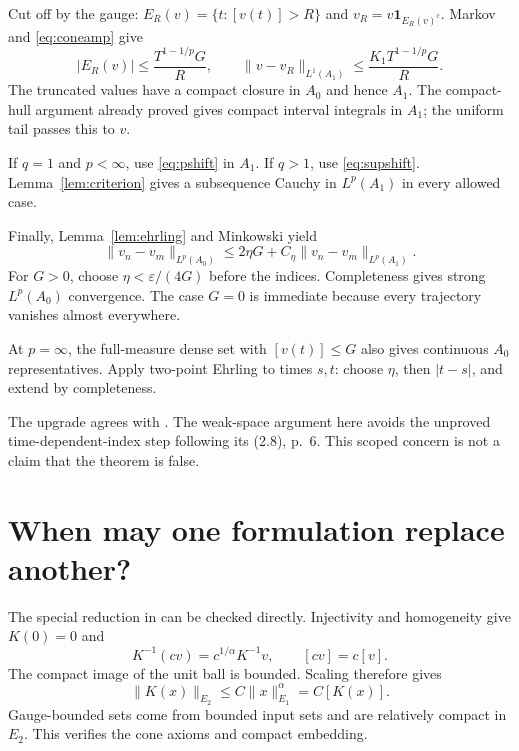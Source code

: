 \documentclass[12pt,reqno]{amsart}
\begin{document}
Cut off by the gauge: $E_R(v)=\{t:[v(t)]>R\}$ and $v_R=v\mathbf1_{E_R(v)^c}$. Markov and \eqref{eq:coneamp} give
\begin{equation}\label{eq:conetail}
|E_R(v)|\le\frac{T^{1-1/p}G}{R},\qquad
\|v-v_R\|_{L^1(A_1)}\le\frac{K_1T^{1-1/p}G}{R}.
\end{equation}
The truncated values have a compact closure in $A_0$ and hence $A_1$. The compact-hull argument already proved gives compact interval integrals in $A_1$; the uniform tail passes this to $v$.

If $q=1$ and $p<\infty$, use \eqref{eq:pshift} in $A_1$. If $q>1$, use \eqref{eq:supshift}. Lemma~\ref{lem:criterion} gives a subsequence Cauchy in $L^p(A_1)$ in every allowed case.

Finally, Lemma~\ref{lem:ehrling} and Minkowski yield
\begin{equation}\label{eq:coneupgrade}
\|v_n-v_m\|_{L^p(A_0)}
\le2\eta G+C_\eta\|v_n-v_m\|_{L^p(A_1)}.
\end{equation}
For $G>0$, choose $\eta<\varepsilon/(4G)$ before the indices. Completeness gives strong $L^p(A_0)$ convergence. The case $G=0$ is immediate because every trajectory vanishes almost everywhere.

At $p=\infty$, the full-measure dense set with $[v(t)]\le G$ also gives continuous $A_0$ representatives. Apply two-point Ehrling to times $s,t$: choose $\eta$, then $|t-s|$, and extend by completeness.

The upgrade agrees with \cite[equation (2.22), pp.~12--13]{S-barrett-suli}. The weak-space argument here avoids the unproved time-dependent-index step following its (2.8), p.~6. This scoped concern is not a claim that the theorem is false.

\section{When may one formulation replace another?}

\begin{proposition}\label{prop:overlap}

\end{proposition}

The special reduction in \cite[Section 4, pp.~15--16]{S-barrett-suli} can be checked directly. Injectivity and homogeneity give $K(0)=0$ and
\[
K^{-1}(cv)=c^{1/\alpha}K^{-1}v,\qquad [cv]=c[v].
\]
The compact image of the unit ball is bounded. Scaling therefore gives
\[
\|K(x)\|_{E_2}\le C\|x\|_{E_1}^{\alpha}=C[K(x)].
\]
Gauge-bounded sets come from bounded input sets and are relatively compact in $E_2$. This verifies the cone axioms and compact embedding.
\end{document}
